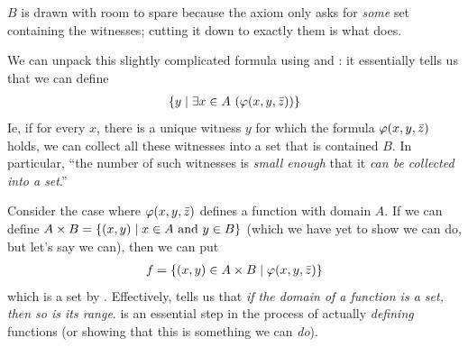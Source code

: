 \begin{figure}[H]
    \centering
\end{figure}

$B$ is drawn with room to spare because the axiom only asks for \textit{some} set containing the witnesses; cutting it down to exactly them is what  does.

We can unpack this slightly complicated formula using  and : it essentially tells us that we can define
\begin{align*}
    \left\{ y \; \middle\vert \; \exists x \in A \, \left( \varphi\!\left( x, y, \bar{z} \right) \right) \right\}
\end{align*}
Ie, if for every $x$, there is a unique witness $y$ for which the formula $\varphi\!\left( x, y, \bar{z} \right)$ holds, we can collect all these witnesses into a set that is contained $B$. In particular, ``the number of such witnesses is \textit{small enough} that it \textit{can be collected into a set}.''

Consider the case where $\varphi\!\left( x, y, \bar{z} \right)$ defines a function with domain $A$. If we can define $A \times B = \left\{ \left( x, y \right) \; \middle\vert \; x \in A \text{ and } y \in B \right\}$ (which we have yet to show we can do, but let's say we can), then we can put
\begin{align*}
    f = \left\{ \left( x, y \right) \in A \times B \; \middle\vert \; \varphi\!\left( x, y, \bar{z} \right) \right\}
\end{align*}
which is a set by . Effectively,  tells us that \textit{if the domain of a function is a set, then so is its range}.  is an essential step in the process of actually \textit{defining} functions (or showing that this is something we can \textit{do}).

